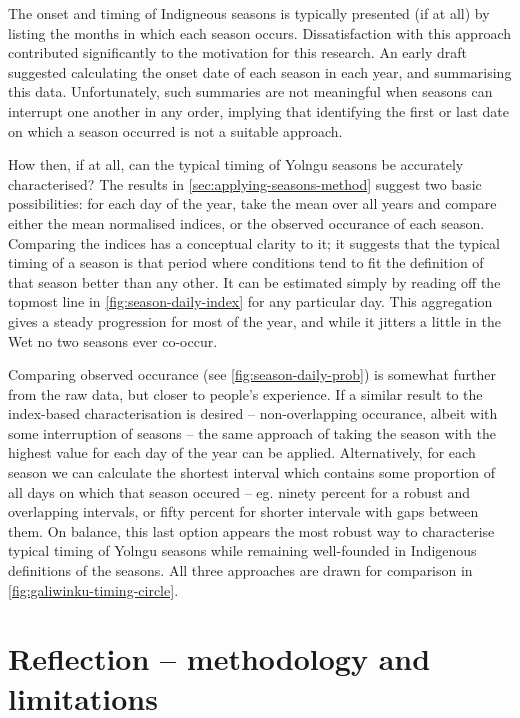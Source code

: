 The onset and timing of Indigneous seasons is typically presented (if at all)
by listing the months in which each season occurs.  Dissatisfaction with this
approach contributed significantly to the motivation for this research.
%
An early draft suggested calculating the onset date of each season in each
year, and summarising this data.  Unfortunately, such summaries are not
meaningful when seasons can interrupt one another in any order, implying
that identifying the first or last date on which a season occurred is not
a suitable approach.

How then, if at all, can the typical timing of Yolngu seasons be accurately
characterised?  The results in \cref{sec:applying-seasons-method} suggest two
basic possibilities: for each day of the year, take the mean over all years
and compare either the mean normalised indices, or the observed occurance
of each season.
%
Comparing the indices has a conceptual clarity to it; it suggests that the
typical timing of a season is that period where conditions tend to fit the
definition of that season better than any other.  It can be estimated simply
by reading off the topmost line in \cref{fig:season-daily-index} for any
particular day.  This aggregation gives a steady progression for most of the
year, and while it jitters a little in the Wet no two seasons ever co-occur.

Comparing observed occurance (see \cref{fig:season-daily-prob}) is somewhat
further from the raw data, but closer to people's experience.  If a similar
result to the index-based characterisation is desired -- non-overlapping
occurance, albeit with some interruption of seasons -- the same approach of taking the season
with the highest value for each day of the year can be applied.
%
Alternatively, for each season we can calculate the shortest interval which
contains some proportion of all days on which that season occured -- eg.
ninety percent for a robust and overlapping intervals, or fifty percent for
shorter intervale with gaps between them.  On balance, this last option
appears the most robust way to characterise typical timing of Yolngu seasons while
remaining well-founded in Indigenous definitions of the seasons.
%
All three approaches are drawn for comparison in \cref{fig:galiwinku-timing-circle}.



\section{Reflection -- methodology and limitations}
\label{sec:disc-reflection}

